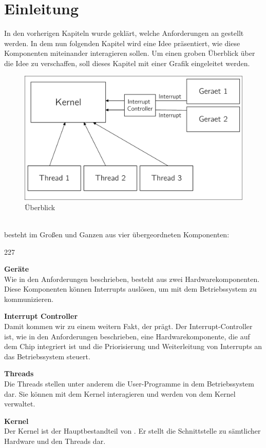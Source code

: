 \section{Einleitung}
In den vorherigen Kapiteln wurde gekl\"art, welche Anforderungen an \mops gestellt werden. In dem nun folgenden Kapitel wird eine Idee pr\"asentiert, wie diese Komponenten miteinander interagieren sollen. Um einen groben \"Uberblick \"uber die Idee zu verschaffen, soll dieses Kapitel mit einer Grafik eingeleitet werden.
\begin{figure}[h!]
	\centering
	\includegraphics[scale=0.60]{common/draft-overview.pdf}	
	\caption{\mops \"Uberblick}
	\label{draft:overview}
\end{figure}\\
\mops besteht im Gro\ss en und Ganzen aus vier \"ubergeordneten Komponenten:
\begin{dinglist}{227}
	\item{\textbf{Ger\"ate}} \\ 
	Wie in den Anforderungen beschrieben, besteht \mops aus zwei Hardwarekomponenten. Diese Komponenten k\"onnen Interrupts ausl\"osen, um mit dem Betriebssystem zu kommunizieren.
	\item{\textbf{Interrupt Controller}} \\
	Damit kommen wir zu einem weitern Fakt, der \mops pr\"agt. Der Interrupt-Controller ist, wie in den Anforderungen beschrieben, eine Hardwarekomponente, die auf dem Chip integriert ist und die Priorisierung und Weiterleitung von Interrupts an das Betriebssystem steuert.
	\item{\textbf{Threads}} \\
	Die Threads stellen unter anderem die User-Programme in dem Betriebssystem dar. Sie k\"onnen mit dem Kernel interagieren und werden von dem Kernel verwaltet.
	\item{\textbf{Kernel}} \\ 
	Der Kernel ist der Hauptbestandteil von \mops. Er stellt die Schnittstelle zu s\"amtlicher Hardware und den Threads dar.
\end{dinglist}
